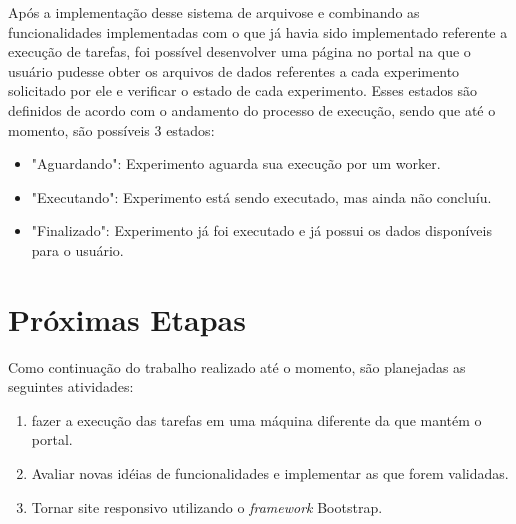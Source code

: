 \documentclass[tg]{mdtufsm}
\begin{document}
Após a implementação desse sistema de arquivose e combinando as funcionalidades implementadas com o que já havia sido implementado referente a execução de tarefas, foi possível desenvolver uma página no portal na que o usuário pudesse obter os arquivos de dados referentes a cada experimento solicitado por ele e verificar o estado de cada experimento. Esses estados são definidos de acordo com o andamento do processo de execução, sendo que até o momento, são possíveis 3 estados: 


\begin{itemize}
	\item "Aguardando": Experimento aguarda sua execução por um worker.
	\item "Executando": Experimento está sendo executado, mas ainda não concluíu.
	\item "Finalizado": Experimento já foi executado e já possui os dados disponíveis para o usuário.
\end{itemize}

\chapter{Próximas Etapas}

Como continuação do trabalho realizado até o momento, são planejadas as seguintes atividades:

\begin{enumerate}
	\item fazer a execução das tarefas em uma máquina diferente da que mantém o portal.
	\item Avaliar novas idéias de funcionalidades e implementar as que forem validadas.
	\item Tornar site responsivo utilizando o \emph{framework} Bootstrap.
\end{enumerate}

\setlength{\baselineskip}{\baselineskip}


\end{document}
